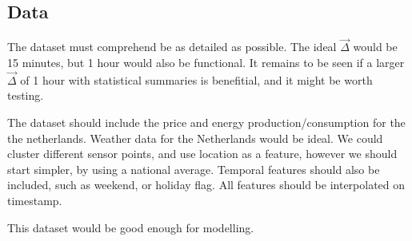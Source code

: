 \subsection{Data}
The dataset must comprehend be as detailed as possible. The ideal $\vec{\Delta}$ would be 15 minutes, but 1 hour would also be functional. It remains to be seen if a larger $\vec{\Delta}$ of 1 hour with statistical summaries
is benefitial, and it might be worth testing.

The dataset should include the price and energy production/consumption for the the netherlands. Weather data for the Netherlands would be ideal. We could cluster different sensor points, and use location as a feature,
however we should start simpler, by using a national average. Temporal features should also be included, such as weekend, or holiday flag. All features should be interpolated on timestamp.

This dataset would be good enough for modelling.